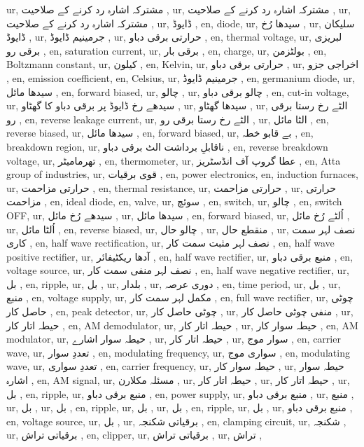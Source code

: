 ur, مشترکہ اشارہ رد کرنے کے صلاحیت ,
ur, مشترکہ اشارہ رد کرنے کے صلاحیت ,
ur, مشترکہ اشارہ رد کرنے کے صلاحیت ,
ur, ڈایوڈ ,
en, diode,
ur, سیدھا رُخ ,
ur, سلیکان ڈایوڈ ,
ur, جرمینیم ڈایوڈ ,
ur, حرارتی برقی دباو ,
en, thermal voltage,
ur, لبریزی برقی رو ,
en, saturation current,
ur, برقی بار ,
en, charge,
ur, بولٹزمن ,
en, Boltzmann constant,
ur, کیلون ,
en, Kelvin,
ur, حرارتی برقی دباو ,
ur, اخراجی جزو ,
en, emission coefficient,
en, Celsius,
ur, جرمینیم ڈایوڈ ,
en, germanium diode,
ur, سیدھا مائل ,
en, forward biased,
ur, چالو ,
ur, چالو برقی دباو ,
en, cut-in voltage,
ur, سیدھے رخ ڈایوڈ پر برقی دباو کا گھٹاو ,
ur, سیدھا گھٹاو ,
ur, الٹے رخ رستا برقی رو ,
en, reverse leakage current,
ur, الٹے رخ رستا برقی رو ,
ur, الٹا مائل ,
en, reverse biased,
ur, سیدھا مائل ,
en, forward biased,
ur, بے قابو خطہ ,
en, breakdown region,
ur, ناقابلِ برداشت الٹ برقی دباو ,
en, reverse breakdown voltage,
ur, تھرمامیٹر ,
en, thermometer,
ur, عطا گروپ آف انڈسٹریز ,
en, Atta group of industries,
ur, قوی برقیات ,
en, power electronics,
en, induction furnaces,
ur, حرارتی مزاحمت ,
en, thermal resistance,
ur, حرارتی مزاحمت ,
ur, حرارتی مزاحمت ,
en, ideal diode,
en, valve,
ur, سوئچ ,
en, switch,
ur, چالو ,
en, switch OFF,
ur, سیدھے رُخ مائل ,
ur, سیدھا مائل ,
en, forward biased,
ur, اُلٹے رُخ مائل ,
ur, اُلٹا مائل ,
en, reverse biased,
ur, چالو حال ,
ur, منقطع حال ,
ur, نصف لہر سمت کاری ,
en, half wave rectification,
ur, نصف لہر مثبت سمت کار ,
en, half wave positive rectifier,
ur, آدھا ریکٹیفائر ,
en, half wave rectifier,
ur, منبع برقی دباو ,
en, voltage source,
ur, نصف لہر منفی سمت کار ,
en, half wave negative rectifier,
ur, بل ,
en, ripple,
ur, بل ,
ur, بلدار ,
ur, دوری عرصہ ,
en, time period,
ur, بل ,
ur, منبع ,
en, voltage supply,
ur, مکمل لہر سمت کار ,
en, full wave rectifier,
ur, چوٹی حاصل کار ,
en, peak detector,
ur, چوٹی حاصل کار ,
ur, منفی چوٹی حاصل کار ,
ur, حیطہ اتار کار ,
en, AM demodulator,
ur, حیطہ اتار کار ,
ur, حیطہ سوار کار ,
en, AM modulator,
ur, حیطہ سوار اشارے ,
ur, حیطہ اتار کار ,
ur, سوار موج ,
en, carrier wave,
ur, تعددِ سوار ,
en, modulating frequency,
ur, سواری موج ,
en, modulating wave,
ur, تعددِ سواری ,
en, carrier frequency,
ur, حیطہ سوار کار ,
ur, حیطہ سوار اشارہ ,
en, AM signal,
ur, مسئلہ مکلارن ,
ur, حیطہ اتار کار ,
ur, حیطہ اتار کار ,
ur, بل ,
en, ripple,
ur, منبع برقی دباو ,
en, power supply,
ur, منبع برقی دباو ,
ur, منبع ,
ur, بل ,
ur, بل ,
en, ripple,
ur, بل ,
ur, بل ,
en, ripple,
ur, بل ,
ur, منبع برقی دباو ,
en, voltage source,
ur, بل ,
ur, برقیاتی شکنجہ ,
en, clamping circuit,
ur, شکنجہ ,
ur, برقیاتی تراش ,
en, clipper,
ur, برقیاتی تراش ,
ur, تراش ,
